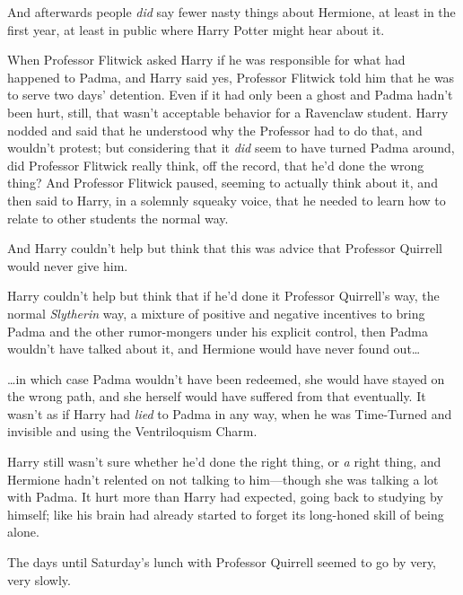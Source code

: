 And afterwards people \emph{did} say fewer nasty things about Hermione, at least in the first year, at least in public where Harry Potter might hear about it.

When Professor Flitwick asked Harry if he was responsible for what had happened to Padma, and Harry said yes, Professor Flitwick told him that he was to serve two days' detention. Even if it had only been a ghost and Padma hadn't been hurt, still, that wasn't acceptable behavior for a Ravenclaw student. Harry nodded and said that he understood why the Professor had to do that, and wouldn't protest; but considering that it \emph{did} seem to have turned Padma around, did Professor Flitwick really think, off the record, that he'd done the wrong thing? And Professor Flitwick paused, seeming to actually think about it, and then said to Harry, in a solemnly squeaky voice, that he needed to learn how to relate to other students the normal way.

And Harry couldn't help but think that this was advice that Professor Quirrell would never give him.

Harry couldn't help but think that if he'd done it Professor Quirrell's way, the normal \emph{Slytherin} way, a mixture of positive and negative incentives to bring Padma and the other rumor-mongers under his explicit control, then Padma wouldn't have talked about it, and Hermione would have never found out{\ldots}

{\ldots}in which case Padma wouldn't have been redeemed, she would have stayed on the wrong path, and she herself would have suffered from that eventually. It wasn't as if Harry had \emph{lied} to Padma in any way, when he was Time-Turned and invisible and using the Ventriloquism Charm.

Harry still wasn't sure whether he'd done the right thing, or \emph{a} right thing, and Hermione hadn't relented on not talking to him---though she was talking a lot with Padma. It hurt more than Harry had expected, going back to studying by himself; like his brain had already started to forget its long-honed skill of being alone.

The days until Saturday's lunch with Professor Quirrell seemed to go by very, very slowly.

